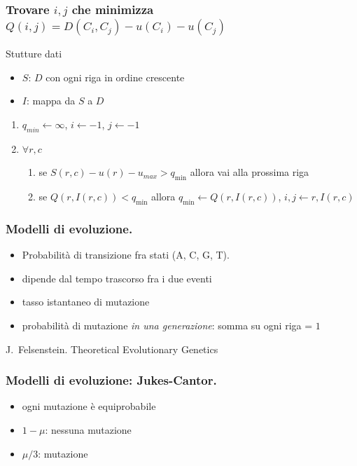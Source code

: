 \begin{frame}[fragile]
\frametitle{Trovare $i, j$ che minimizza $Q(i, j) = D(C_{i}, C_{j}) - u(C_{i}) -u(C_{j})$}
        \begin{block}{Stutture dati}
\begin{itemize}
\item $S$: $D$ con ogni riga in ordine crescente
\item
          $I$: mappa da $S$ a $D$
\end{itemize}

\begin{enumerate}
\item $q_{min} \gets \infty$, $i \gets -1$, $j \gets  -1$
\item
          $\forall r,c$
          \begin{enumerate}
          \item se $S(r, c) - u(r) - u_{max} > q_{\min }$ allora vai alla prossima riga
          \item se $Q(r, I(r, c)) < q_{\min }$ allora  $q_{\min } \gets Q(r, I(r, c))$, $i,j \gets r, I(r, c)$
          \end{enumerate}
\end{enumerate}
\end{block}
\end{frame}

\begin{frame}[fragile]
	\frametitle{Modelli di evoluzione.}
	\begin{itemize}
		\item
		      Probabilità di transizione fra stati (A, C, G, T).
		\item
		      dipende dal tempo trascorso fra i due eventi
		\item
		      tasso istantaneo di mutazione
		\item
		      probabilità di mutazione \emph{in una generazione}: somma su ogni riga = $1$
	\end{itemize}

	J.~Felsenstein.
	Theoretical Evolutionary Genetics
\end{frame}

\begin{frame}[fragile]
	\frametitle{Modelli di evoluzione: Jukes-Cantor.}
	\begin{itemize}
		\item
		      ogni mutazione è equiprobabile
		\item
		      $1-\mu$: nessuna mutazione
		\item
		      $\mu/3$: mutazione
	\end{itemize}
\end{frame}

